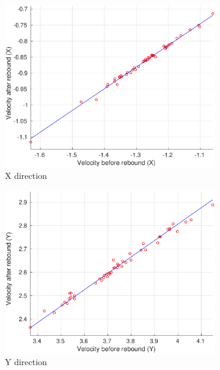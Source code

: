 \begin{figure}
  \begin{subfigure}[b]{0.16\textwidth}
    \centering
    \includegraphics[width=\textwidth]{velXRebound.eps}
    \caption{X direction}
    \label{fig:1}
  \end{subfigure}\begin{subfigure}[b]{0.16\textwidth}
  	\centering
    \includegraphics[width=\textwidth]{velYRebound.eps}
    \caption{Y direction}
    \label{fig:2}
  \end{subfigure}\begin{subfigure}[b]{0.16\textwidth}
    	\centering

\end{subfigure}
\end{figure}
